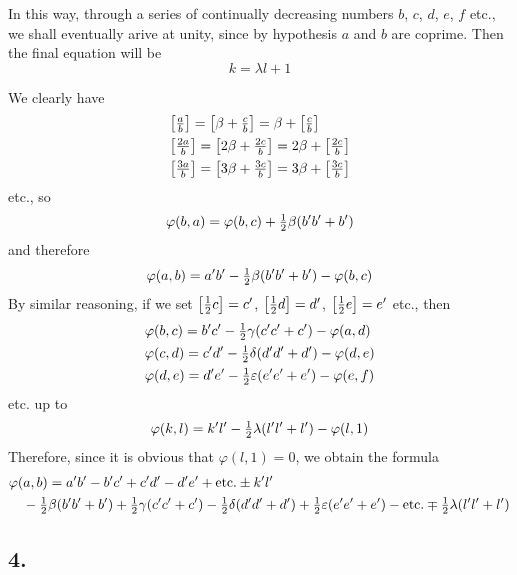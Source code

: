 \documentclass[twoside,12pt]{memoir}
\let\oldfrac\frac
\def\frac#1#2{\mathchoice{\tfrac{#1}{#2}}{\oldfrac{#1}{#2}}{\genfrac{}{}{}{2}{#1}{#2\mathstrut}}{\genfrac{}{}{}{3}{#1}{#2\mathstrut}}}
\begin{document}
In this way, through a series of continually decreasing numbers \(b\), \(c\), \(d\), \(e\), \(f\) etc{.}, we shall eventually arive at unity, since by hypothesis \(a\) and \(b\) are coprime.  Then the final equation will be
\[k=\lambda l+1\]
%

We clearly have
\[\begin{aligned}
& {\left[\frac{a}{b}\right]=\left[\beta+\frac{c}{b}\right]=\beta+\left[\frac{c}{b}\right]} \\
& {\left[\frac{2 a}{b}\right]=\left[2 \beta+\frac{2 c}{b}\right]=2 \beta+\left[\frac{2 c}{b}\right]} \\
& {\left[\frac{3 a}{b}\right]=\left[3 \beta+\frac{3 c}{b}\right]=3 \beta+\left[\frac{3 c}{b}\right]}
\end{aligned}\]
etc{.}, so
\[\varphi(b, a)=\varphi(b, c)+\frac{1}{2} \beta (b^{\prime} b^{\prime}+b^{\prime})\]
and therefore
\[\varphi(a, b)=a^{\prime} b^{\prime}-\frac{1}{2} \beta (b^{\prime} b^{\prime}+b^{\prime})-\varphi(b, c)\]
By similar reasoning, if we set \(\left[\frac{1}{2} c\right]=c^{\prime}\), \(\left[\frac{1}{2} d\right]=d^{\prime}\), \(\left[\frac{1}{2} e\right]=e^{\prime}\) etc{.}, then
\[\begin{aligned}
& \varphi(b, c)=b^{\prime} c^{\prime}-\frac{1}{2} \gamma(c^{\prime} c^{\prime}+c^{\prime})-\varphi(a, d) \\
& \varphi(c, d)=c^{\prime} d^{\prime}-\frac{1}{2} \delta(d^{\prime} d^{\prime}+d^{\prime})-\varphi(d, e) \\
& \varphi(d, e)=d^{\prime} e^{\prime}-\frac{1}{2} \varepsilon(e^{\prime} e^{\prime}+e^{\prime})-\varphi(e, f)
\end{aligned}\]
etc{.} up to
\[\varphi(k, l)=k^{\prime} l^{\prime}-\frac{1}{2} \lambda(l^{\prime} l^{\prime}+l^{\prime})-\varphi(l, 1)\]
Therefore, since it is obvious that \(\varphi(l, 1)=0\), we obtain the formula
\[\begin{aligned}
& \varphi(a, b)=a^{\prime} b^{\prime}-b^{\prime} c^{\prime}+c^{\prime} d^{\prime}-d^{\prime} e^{\prime}+\text{etc{.}} \pm k^{\prime} l^{\prime} \\
& \quad-\frac{1}{2} \beta (b^{\prime} b^{\prime}+b^{\prime})+\frac{1}{2} \gamma(c^{\prime} c^{\prime}+c^{\prime})-\frac{1}{2} \delta(d^{\prime} d^{\prime}+d^{\prime})+\frac{1}{2} \varepsilon(e^{\prime} e^{\prime}+e^{\prime})-\text{etc{.}} \mp \frac{1}{2} \lambda(l^{\prime} l^{\prime}+l^{\prime})
\end{aligned}\]
%

\subsection*{4.}
 
\end{document}

